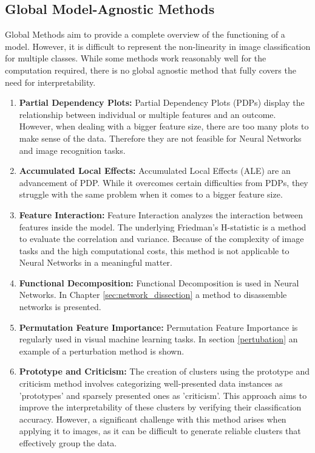 \subsection{Global Model-Agnostic Methods}

Global Methods aim to provide a complete overview of the functioning of a model. However, it is difficult to represent the non-linearity in image classification for multiple classes. While some methods work reasonably well for the computation required, there is no global agnostic method that fully covers the need for interpretability.

\begin{enumerate}
	\item \textbf{Partial Dependency Plots:} Partial Dependency Plots (PDPs)\cite{PDP} display the relationship between individual or multiple features and an outcome. However, when dealing with a bigger feature size, there are too many plots to make sense of the data. Therefore they are not feasible for Neural Networks and image recognition tasks.
	\item \textbf{Accumulated Local Effects:} Accumulated Local Effects (ALE)\cite{apley2019visualizing} are an advancement of PDP. While it overcomes certain difficulties from PDPs, they struggle with the same problem when it comes to a bigger feature size.
	\item \textbf{Feature Interaction:} Feature Interaction analyzes the interaction between features inside the model. The underlying Friedman's H-statistic\cite{friedman2008predictive} is a method to evaluate the correlation and variance. Because of the complexity of image tasks and the high computational costs, this method is not applicable to Neural Networks in a meaningful matter.
	\item \textbf{Functional Decomposition:} Functional Decomposition is used in Neural Networks. In Chapter \ref{sec:network_dissection} a method to disassemble networks is presented.
	\item \textbf{Permutation Feature Importance:} Permutation Feature Importance is regularly used in visual machine learning tasks. In section \ref{pertubation} an example of a perturbation method is shown.
	\item \textbf{Prototype and Criticism:} The creation of clusters using the prototype and criticism method involves categorizing well-presented data instances as 'prototypes' and sparsely presented ones as 'criticism'. This approach aims to improve the interpretability of these clusters by verifying their classification accuracy. However, a significant challenge with this method arises when applying it to images, as it can be difficult to generate reliable clusters that effectively group the data.
\end{enumerate}


